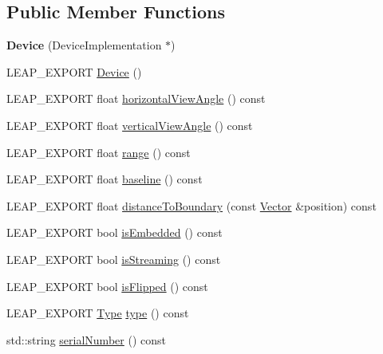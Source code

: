 \subsection*{Public Member Functions}
\begin{DoxyCompactItemize}
\item 
\mbox{\label{class_leap_1_1_device_a7ec1c5a141f6b5de72846944fad60066}} 
{\bfseries Device} (Device\+Implementation $\ast$)
\item 
L\+E\+A\+P\+\_\+\+E\+X\+P\+O\+RT \hyperlink{class_leap_1_1_device_ab14c21cd02a6773fa699980cb58032e2}{Device} ()
\item 
L\+E\+A\+P\+\_\+\+E\+X\+P\+O\+RT float \hyperlink{class_leap_1_1_device_aea496995019d62785d7ec404751e531b}{horizontal\+View\+Angle} () const
\item 
L\+E\+A\+P\+\_\+\+E\+X\+P\+O\+RT float \hyperlink{class_leap_1_1_device_ac7b494b9dba80bdd97c33eff0b718691}{vertical\+View\+Angle} () const
\item 
L\+E\+A\+P\+\_\+\+E\+X\+P\+O\+RT float \hyperlink{class_leap_1_1_device_a700dd78b7ef8e74695886e510ff43f13}{range} () const
\item 
L\+E\+A\+P\+\_\+\+E\+X\+P\+O\+RT float \hyperlink{class_leap_1_1_device_a53a212f30052d9e0c4d7ae028a85a620}{baseline} () const
\item 
L\+E\+A\+P\+\_\+\+E\+X\+P\+O\+RT float \hyperlink{class_leap_1_1_device_aefca616eabf05ac048539a65feb2749d}{distance\+To\+Boundary} (const \hyperlink{struct_leap_1_1_vector}{Vector} \&position) const
\item 
L\+E\+A\+P\+\_\+\+E\+X\+P\+O\+RT bool \hyperlink{class_leap_1_1_device_a5d5ae9a0fe53f99acd634e5dc377f2fe}{is\+Embedded} () const
\item 
L\+E\+A\+P\+\_\+\+E\+X\+P\+O\+RT bool \hyperlink{class_leap_1_1_device_a0a3998a6914e09f1bcfb7e8d623bea37}{is\+Streaming} () const
\item 
L\+E\+A\+P\+\_\+\+E\+X\+P\+O\+RT bool \hyperlink{class_leap_1_1_device_ab384868ebc0ceb7325645691da90e470}{is\+Flipped} () const
\item 
L\+E\+A\+P\+\_\+\+E\+X\+P\+O\+RT \hyperlink{class_leap_1_1_device_a1b7477f6d382b15a77a00712a70628b2}{Type} \hyperlink{class_leap_1_1_device_a3668b9d01ca7e2fbbf1a2a313abe799a}{type} () const
\item 
std\+::string \hyperlink{class_leap_1_1_device_a8a9cf315850c0d54fdc31748fdad6444}{serial\+Number} () const
\item 
\mbox{\label{class_leap_1_1_device_a51b98795f562e30f91a3e2d8f40de1de}} 

\end{DoxyCompactItemize}
